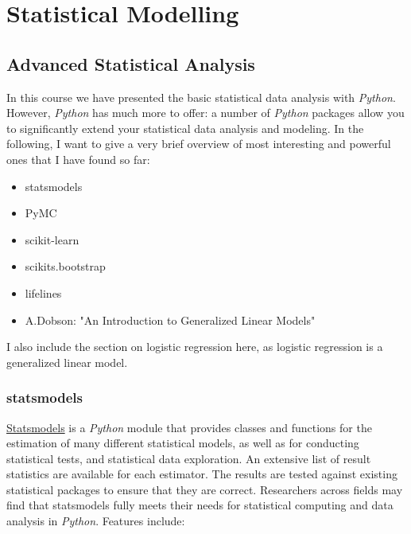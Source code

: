 \part{Statistical Modelling}

\chapter{Advanced Statistical Analysis}

In this course we have presented the basic statistical data analysis with \emph{Python}. However, \emph{Python} has much more to offer: a number of \emph{Python} packages allow you to significantly extend your statistical data analysis and modeling. In the following, I want to give a very brief overview of most interesting and powerful ones that I have found so far:

\begin{itemize}
  \item statsmodels
  \item PyMC
  \item scikit-learn
  \item scikits.bootstrap
  \item lifelines
  \item A.Dobson: "An Introduction to Generalized Linear Models"
\end{itemize}

I also include the section on logistic regression here, as logistic regression is a generalized linear model.

\section{statsmodels}

\href{http://statsmodels.sourceforge.net/}{Statsmodels} is a \emph{Python} module that provides classes and functions for the estimation of many different statistical models, as well as for conducting statistical tests, and statistical data exploration. An extensive list of result statistics are available for each estimator. The results are tested against existing statistical packages to ensure that they are correct. Researchers across fields may find that statsmodels fully meets their needs for statistical computing and data analysis in \emph{Python}. Features include:

